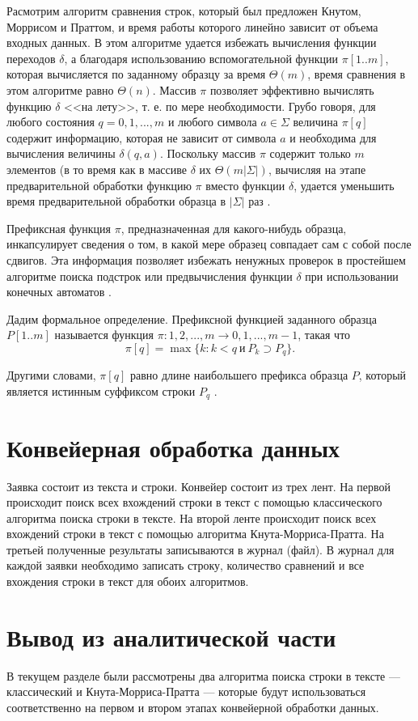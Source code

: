 Расмотрим алгоритм сравнения строк, который был предложен Кнутом, Моррисом и Праттом, и время работы которого линейно зависит от объема входных данных. 
В этом алгоритме удается избежать вычисления функции переходов $\delta$, а благодаря использованию вспомогательной функции $\pi [1..m]$, которая вычисляется по заданному образцу за время $\Theta (m)$, время сравнения в этом алгоритме равно $\Theta (n)$. 
Массив $\pi$ позволяет эффективно вычислять функцию $\delta$ <<на лету>>, т. е. по мере необходимости. 
Грубо говоря, для любого состояния $q = 0, 1, ..., m$ и любого символа $a \in \Sigma$ величина $\pi [q]$ содержит информацию, которая не зависит от символа $a$ и необходима для вычисления величины $\delta (q, a)$. 
Поскольку массив $\pi$ содержит только $m$ элементов (в то время как в массиве $\delta$ их $\Theta (m |\Sigma|)$, вычисляя на этапе предварительной обработки функцию $\pi$ вместо функции $\delta$, удается уменьшить время предварительной обработки образца в $|\Sigma|$ раз \cite{Cormen2013}.

Префиксная функция $\pi$, предназначенная для какого-нибудь образца, инкапсулирует сведения о том, в какой мере образец совпадает сам с собой после сдвигов. 
Эта информация позволяет избежать ненужных проверок в простейшем алгоритме поиска подстрок или предвычисления функции $\delta$ при использовании конечных автоматов \cite{Cormen2013}.

Дадим формальное определение. 
Префиксной функцией заданного образца $P[1..m]$ называется функция $\pi : {1, 2, ..., m} \to {0, 1, ..., m - 1}$, такая что
\begin{equation}
	\pi [q] = \max\{k: k < q~\text{и}~P_k \supset P_q\}.
\end{equation}

Другими словами, $\pi [q]$ равно длине наибольшего префикса образца $P$, который является истинным суффиксом строки $P_q$ \cite{Cormen2013}.

\section{Конвейерная обработка данных}

Заявка состоит из текста и строки. 
Конвейер состоит из трех лент. 
На первой происходит поиск всех вхождений строки в текст с помощью классического алгоритма поиска строки в тексте. 
На второй ленте происходит поиск всех вхождений строки в текст с помощью алгоритма Кнута-Морриса-Пратта. 
На третьей полученные результаты записываются в журнал (файл). 
В журнал для каждой заявки необходимо записать строку, количество сравнений и все вхождения строки в текст для обоих алгоритмов.

\section*{Вывод из аналитической части}

В текущем разделе были рассмотрены два алгоритма поиска строки в тексте --- классический и Кнута-Морриса-Пратта --- которые будут использоваться соответственно на первом и втором этапах конвейерной обработки данных. 
